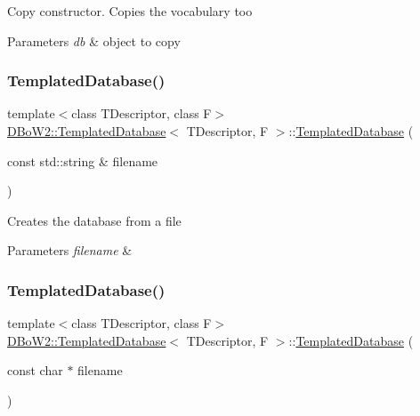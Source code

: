 Copy constructor. Copies the vocabulary too 
\begin{DoxyParams}{Parameters}
{\em db} & object to copy \\
\hline
\end{DoxyParams}
\mbox{\label{classDBoW2_1_1TemplatedDatabase_a811328512cdcb50220ca4f38a8982132}} 
\subsubsection{\texorpdfstring{Templated\+Database()}{TemplatedDatabase()}\hspace{0.1cm}{\footnotesize\ttfamily [4/5]}}
{\footnotesize\ttfamily template$<$class T\+Descriptor, class F$>$ \\
\hyperlink{classDBoW2_1_1TemplatedDatabase}{D\+Bo\+W2\+::\+Templated\+Database}$<$ T\+Descriptor, F $>$\+::\hyperlink{classDBoW2_1_1TemplatedDatabase}{Templated\+Database} (\begin{DoxyParamCaption}\item[{const std\+::string \&}]{filename }\end{DoxyParamCaption})}

Creates the database from a file 
\begin{DoxyParams}{Parameters}
{\em filename} & \\
\hline
\end{DoxyParams}
\mbox{\label{classDBoW2_1_1TemplatedDatabase_a4e93c45263abda6bd1870e1baae820b0}} 
\subsubsection{\texorpdfstring{Templated\+Database()}{TemplatedDatabase()}\hspace{0.1cm}{\footnotesize\ttfamily [5/5]}}
{\footnotesize\ttfamily template$<$class T\+Descriptor, class F$>$ \\
\hyperlink{classDBoW2_1_1TemplatedDatabase}{D\+Bo\+W2\+::\+Templated\+Database}$<$ T\+Descriptor, F $>$\+::\hyperlink{classDBoW2_1_1TemplatedDatabase}{Templated\+Database} (\begin{DoxyParamCaption}\item[{const char $\ast$}]{filename }\end{DoxyParamCaption})}

